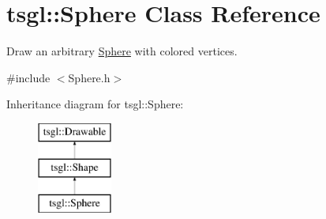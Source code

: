 \hypertarget{classtsgl_1_1_sphere}{}\section{tsgl\+:\+:Sphere Class Reference}
\label{classtsgl_1_1_sphere}


Draw an arbitrary \hyperlink{classtsgl_1_1_sphere}{Sphere} with colored vertices.  




{\ttfamily \#include $<$Sphere.\+h$>$}

Inheritance diagram for tsgl\+:\+:Sphere\+:\begin{figure}[H]
\begin{center}
\leavevmode
\includegraphics[height=3.000000cm]{classtsgl_1_1_sphere}
\end{center}
\end{figure}
